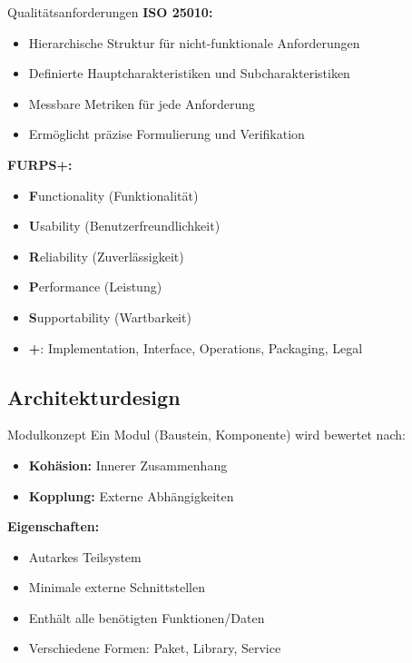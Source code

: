 \begin{theorem}{Qualitätsanforderungen}
\textbf{ISO 25010:}
\begin{itemize}
    \item Hierarchische Struktur für nicht-funktionale Anforderungen
    \item Definierte Hauptcharakteristiken und Subcharakteristiken
    \item Messbare Metriken für jede Anforderung
    \item Ermöglicht präzise Formulierung und Verifikation
\end{itemize}

\textbf{FURPS+:}
\begin{itemize}
    \item \textbf{F}unctionality (Funktionalität)
    \item \textbf{U}sability (Benutzerfreundlichkeit)
    \item \textbf{R}eliability (Zuverlässigkeit)
    \item \textbf{P}erformance (Leistung)
    \item \textbf{S}upportability (Wartbarkeit)
    \item \textbf{+}: Implementation, Interface, Operations, Packaging, Legal
\end{itemize}
\end{theorem}

\subsection{Architekturdesign}

\begin{concept}{Modulkonzept}
Ein Modul (Baustein, Komponente) wird bewertet nach:
\begin{itemize}
    \item \textbf{Kohäsion:} Innerer Zusammenhang
    \item \textbf{Kopplung:} Externe Abhängigkeiten
\end{itemize}

\textbf{Eigenschaften:}
\begin{itemize}
    \item Autarkes Teilsystem
    \item Minimale externe Schnittstellen
    \item Enthält alle benötigten Funktionen/Daten
    \item Verschiedene Formen: Paket, Library, Service
\end{itemize}
\end{concept}

